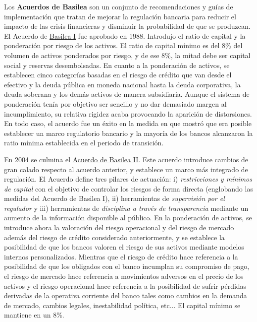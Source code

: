 \documentclass{nuevotema}
\begin{document}
Los \textbf{Acuerdos de Basilea} son un conjunto de recomendaciones y guías de implementación que tratan de mejorar la regulación bancaria para reducir el impacto de las crisis financieras y disminuir la probabilidad de que se produzcan. El Acuerdo de \underline{Basilea I} fue aprobado en 1988. Introdujo el ratio de capital y la ponderación por riesgo de los activos. El ratio de capital mínimo es del 8\% del volumen de activos ponderados por riesgo, y de ese 8\%, la mitad debe ser capital social y reservas desembolsadas. En cuanto a la ponderación de activos, se establecen cinco categorías basadas en el riesgo de crédito que van desde el efectivo y la deuda pública en moneda nacional hasta la deuda corporativa, la deuda soberana y los demás activos de manera subsidiaria. Aunque el sistema de ponderación tenía por objetivo ser sencillo y no dar demasiado margen al incumplimiento, su relativa rigidez acaba provocando la aparición de distorsiones. En todo caso, el acuerdo fue un éxito en la medida en que mostró que era posible establecer un marco regulatorio bancario y la mayoría de los bancos alcanzaron la ratio mínima establecida en el periodo de transición.

En 2004 se culmina el \underline{Acuerdo de Basilea II}. Este acuerdo introduce cambios de gran calado respecto al acuerdo anterior, y establece un marco más integrado de regulación. El Acuerdo define tres pilares de actuación: i) \textit{restricciones y mínimos de capital} con el objetivo de controlar los riesgos de forma directa (englobando las medidas del Acuerdo de Basilea I), ii) herramientas de \textit{supervisión por el regulador} y iii) herramientas de \textit{disciplina a través de transparencia} mediante un aumento de la información disponible al público. En la ponderación de activos, se introduce ahora la valoración del riesgo operacional y del riesgo de mercado además del riesgo de crédito considerado anteriormente, y se establece la posibilidad de que los bancos valoren el riesgo de sus activos mediante modelos internos personalizados. Mientras que el riesgo de crédito hace referencia a la posibilidad de que los obligados con el banco incumplan su compromiso de pago, el riesgo de mercado hace referencia a movimientos adversos en el precio de los activos y el riesgo operacional hace referencia a la posibilidad de sufrir pérdidas derivadas de la operativa corriente del banco tales como cambios en la demanda de mercado, cambios legales, inestabilidad política, etc... El capital mínimo se mantiene en un 8\%. 
\end{document}
